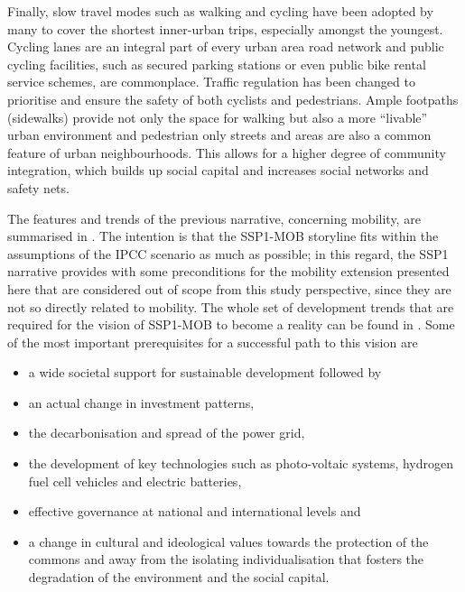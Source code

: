{Finally, slow travel modes such as walking and cycling have been adopted by many to cover the shortest inner-urban trips, especially amongst the youngest. Cycling lanes are an integral part of every urban area road network and public cycling facilities, such as secured parking stations or even public bike rental service schemes, are commonplace. Traffic regulation has been changed to prioritise and ensure the safety of both cyclists and pedestrians. Ample footpaths (sidewalks) provide not only the space for walking but also a more ``livable'' urban environment and pedestrian only streets and areas are also a common feature of urban neighbourhoods. This allows for a higher degree of community integration, which builds up social capital and increases social networks and safety nets.
}

The features and trends of the previous narrative, concerning mobility, are summarised in . The intention is that the SSP1-MOB storyline fits within the assumptions of the \gls{IPCC} scenario as much as possible; in this regard, the SSP1 narrative provides with some preconditions for the mobility extension presented here that are considered out of scope from this study perspective, since they are not so directly related to mobility. The whole set of development trends that are required for the vision of SSP1-MOB to become a reality can be found in \textcite{vuuren2017_Energylanduse,oneill2017_roadsaheadNarratives}. Some of the most important prerequisites for a successful path to this vision are
%
\begin{itemize}
\item a wide societal support for sustainable development followed by
\item an actual change in investment patterns,
\item the decarbonisation and spread of the power grid,
\item the development of key technologies such as photo-voltaic systems, hydrogen fuel cell vehicles and electric batteries,
\item effective governance at national and international levels and
\item a change in cultural and ideological values towards the protection of the commons and away from the isolating individualisation that fosters the degradation of the environment and the social capital.
\end{itemize}
%
